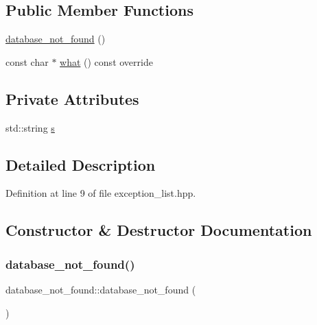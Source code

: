 \subsection*{Public Member Functions}
\begin{DoxyCompactItemize}
\item 
\hyperlink{classdatabase__not__found_ae070ad0aef4b823f0b5597282a9521b4}{database\+\_\+not\+\_\+found} ()
\item 
const char $\ast$ \hyperlink{classdatabase__not__found_a820ce168a5d088576bcbc5ef6a26e4d1}{what} () const override
\end{DoxyCompactItemize}
\subsection*{Private Attributes}
\begin{DoxyCompactItemize}
\item 
std\+::string \hyperlink{classdatabase__not__found_a28b5ae319795530992f9d614ea1a2a5d}{s}
\end{DoxyCompactItemize}


\subsection{Detailed Description}


Definition at line 9 of file exception\+\_\+list.\+hpp.



\subsection{Constructor \& Destructor Documentation}
\mbox{\label{classdatabase__not__found_ae070ad0aef4b823f0b5597282a9521b4}} 
\subsubsection{\texorpdfstring{database\+\_\+not\+\_\+found()}{database\_not\_found()}}
{\footnotesize\ttfamily database\+\_\+not\+\_\+found\+::database\+\_\+not\+\_\+found (\begin{DoxyParamCaption}{ }\end{DoxyParamCaption})\hspace{0.3cm}{\ttfamily [inline]}}



